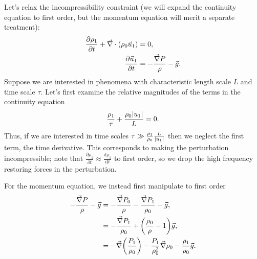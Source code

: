 \documentclass[11pt,
        usenames, %
        dvipsnames %
    ]{report}
\newcommand*{\rd}[2]{\frac{\mathrm{d}#1}{\mathrm{d}#2}}
\newcommand*{\pd}[2]{\frac{\partial#1}{\partial#2}}
\DeclarePairedDelimiter\abs{\lvert}{\rvert}
\DeclarePairedDelimiter\p{\lparen}{\rparen}
\begin{document}
Let's relax the incompressibility constraint (we will expand the continuity
equation to first order, but the momentum equation will merit a separate
treatment):
\begin{equation}
    \begin{split}
        \pd{\rho_1}{t} + \vec{\nabla} \cdot \p*{\rho_0 \vec{u}_1} &= 0,\\
        \pd{\vec{u}_1}{t} &= -\frac{\vec{\nabla}P}{\rho} - \vec{g}.
    \end{split}
\end{equation}
Suppose we are interested in phenomena with characteristic length scale $L$ and
time scale $\tau$. Let's first examine the relative magnitudes of the terms in
the continuity equation
\begin{equation*}
    \frac{\rho_1}{\tau} + \frac{\rho_0 \abs{u_1}}{L} = 0.
\end{equation*}
Thus, if we are interested in time scales $\tau \gg
\frac{\rho_1}{\rho_0}\frac{L}{\abs{u_1}}$ then we neglect the first term, the
time derivative. This corresponds to making the perturbation incompressible;
note that $\pd{\rho_1}{t} \approx \rd{\rho_1}{t}$ to first order, so we drop the
high frequency restoring forces in the perturbation.

For the momentum equation, we instead first manipulate to first order
\begin{align}
    -\frac{\vec{\nabla}P}{\rho} - \vec{g}
        &= -\frac{\vec{\nabla}P_0}{\rho} - \frac{\vec{\nabla}P_1}{\rho_0}
            - \vec{g},\nonumber\\
        &= - \frac{\vec{\nabla}P_1}{\rho_0} +
            \p*{\frac{\rho_0}{\rho} - 1}\vec{g},\nonumber\\
        &= -\vec{\nabla}\p*{\frac{P_1}{\rho_0}}
            - \frac{P_1}{\rho_0^2}\vec{\nabla}\rho_0
            - \frac{\rho_1}{\rho_0}\vec{g}.
\end{align}
\end{document}
